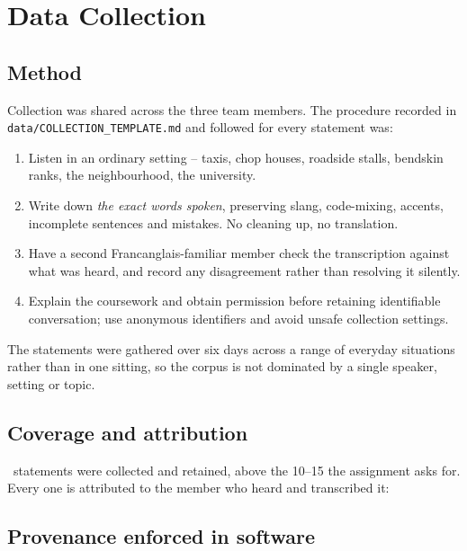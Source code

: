 \section{Data Collection}\label{sec:data}

\subsection{Method}

Collection was shared across the three team members. The procedure recorded in
\texttt{data/\allowbreak COLLECTION\_\allowbreak TEMPLATE.md} and followed for every
statement was:

\begin{enumerate}[leftmargin=1.4em, itemsep=0.2em]
  \item Listen in an ordinary setting -- taxis, chop houses, roadside stalls, bendskin
        ranks, the neighbourhood, the university.
  \item Write down \emph{the exact words spoken}, preserving slang, code-mixing, accents,
        incomplete sentences and mistakes. No cleaning up, no translation.
  \item Have a second Francanglais-familiar member check the transcription against what
        was heard, and record any disagreement rather than resolving it silently.
  \item Explain the coursework and obtain permission before retaining identifiable
        conversation; use anonymous identifiers and avoid unsafe collection settings.
\end{enumerate}

The statements were gathered over six days across a range of everyday situations rather
than in one sitting, so the corpus is not dominated by a single speaker, setting or topic.

\subsection{Coverage and attribution}

\CorpusTotal\ statements were collected and retained, above the 10--15 the assignment asks
for. Every one is attributed to the member who heard and transcribed it:

\begin{center}

\end{center}

\subsection{Provenance enforced in software}

